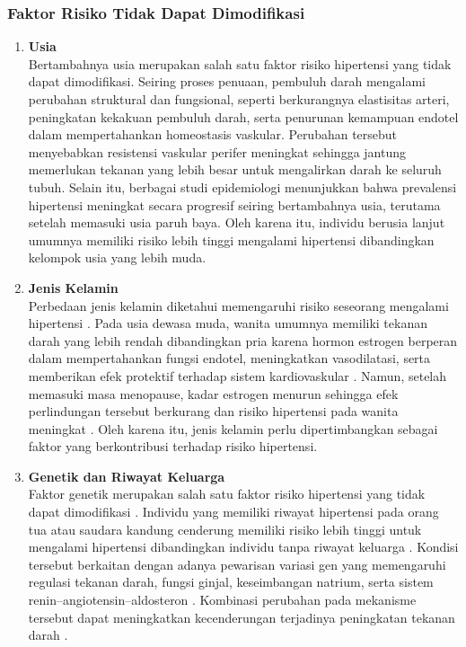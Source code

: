 \subsubsection{Faktor Risiko Tidak Dapat Dimodifikasi}
\begin{enumerate}
    \item \textbf{Usia}\\
    Bertambahnya usia merupakan salah satu faktor risiko hipertensi yang tidak dapat dimodifikasi.\autocite{Mills2020Global} Seiring proses penuaan, pembuluh darah mengalami perubahan struktural dan fungsional, seperti berkurangnya elastisitas arteri, peningkatan kekakuan pembuluh darah, serta penurunan kemampuan endotel dalam mempertahankan homeostasis vaskular.\autocite{Benetos2019} Perubahan tersebut menyebabkan resistensi vaskular perifer meningkat sehingga jantung memerlukan tekanan yang lebih besar untuk mengalirkan darah ke seluruh tubuh.\autocite{Benetos2019} Selain itu, berbagai studi epidemiologi menunjukkan bahwa prevalensi hipertensi meningkat secara progresif seiring bertambahnya usia, terutama setelah memasuki usia paruh baya.\autocite{Mills2020Global} Oleh karena itu, individu berusia lanjut umumnya memiliki risiko lebih tinggi mengalami hipertensi dibandingkan kelompok usia yang lebih muda.
    
    \item \textbf{Jenis Kelamin}\\
    Perbedaan jenis kelamin diketahui memengaruhi risiko seseorang mengalami hipertensi \autocite{Reckelhoff2018}. Pada usia dewasa muda, wanita umumnya memiliki tekanan darah yang lebih rendah dibandingkan pria karena hormon estrogen berperan dalam mempertahankan fungsi endotel, meningkatkan vasodilatasi, serta memberikan efek protektif terhadap sistem kardiovaskular \autocite{Reckelhoff2018}. Namun, setelah memasuki masa menopause, kadar estrogen menurun sehingga efek perlindungan tersebut berkurang dan risiko hipertensi pada wanita meningkat \autocite{Ji2020}. Oleh karena itu, jenis kelamin perlu dipertimbangkan sebagai faktor yang berkontribusi terhadap risiko hipertensi.
    
    \item \textbf{Genetik dan Riwayat Keluarga}\\
    Faktor genetik merupakan salah satu faktor risiko hipertensi yang tidak dapat dimodifikasi \autocite{Padmanabhan2015}. Individu yang memiliki riwayat hipertensi pada orang tua atau saudara kandung cenderung memiliki risiko lebih tinggi untuk mengalami hipertensi dibandingkan individu tanpa riwayat keluarga \autocite{Mills2020Global}. Kondisi tersebut berkaitan dengan adanya pewarisan variasi gen yang memengaruhi regulasi tekanan darah, fungsi ginjal, keseimbangan natrium, serta sistem renin--angiotensin--aldosteron \autocite{Padmanabhan2015}. Kombinasi perubahan pada mekanisme tersebut dapat meningkatkan kecenderungan terjadinya peningkatan tekanan darah \autocite{Padmanabhan2015}.
\end{enumerate}

